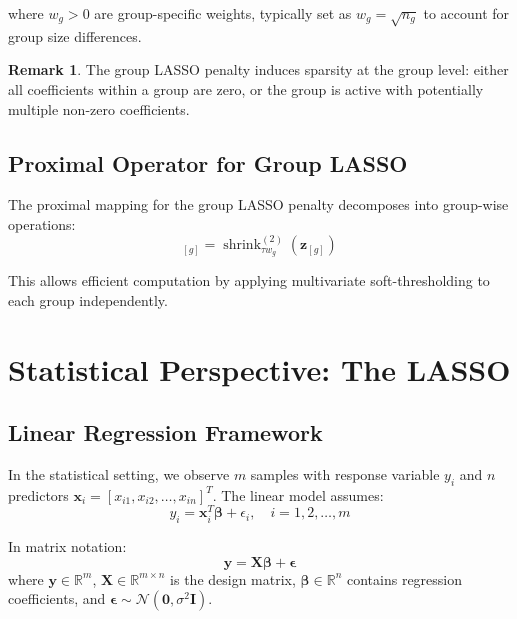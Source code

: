 \documentclass[12pt]{article}
\renewcommand{\vec}[1]{\mathbf{#1}}
\DeclareMathOperator{\prox}{prox}
\DeclareMathOperator{\shrink}{shrink}
\theoremstyle{definition}
\newtheorem{remark}{Remark}[section]
\begin{document}
where $w_g > 0$ are group-specific weights, typically set as $w_g = \sqrt{n_g}$ to account for group size differences.

\begin{remark}
    The group LASSO penalty induces sparsity at the group level: either all coefficients within a group are zero, or the group is active with potentially multiple non-zero coefficients.
\end{remark}

\subsection{Proximal Operator for Group LASSO}

The proximal mapping for the group LASSO penalty decomposes into group-wise operations:
\begin{equation}
    [\prox_{\tau\sum_g w_g\|\cdot\|_2}(\vec{z})]_{[g]} = \shrink_{\tau w_g}^{(2)}(\vec{z}_{[g]})
\end{equation}

This allows efficient computation by applying multivariate soft-thresholding to each group independently.

\newpage

\section{Statistical Perspective: The LASSO}

\subsection{Linear Regression Framework}

In the statistical setting, we observe $m$ samples with response variable $y_i$ and $n$ predictors $\vec{x}_i = [x_{i1}, x_{i2}, \ldots, x_{in}]^T$. The linear model assumes:
\begin{equation}
    y_i = \vec{x}_i^T\vec{\beta} + \epsilon_i, \quad i = 1, 2, \ldots, m
    \label{eq:linear_model}
\end{equation}

In matrix notation:
\begin{equation}
    \vec{y} = \vec{X}\vec{\beta} + \vec{\epsilon}
\end{equation}
where $\vec{y} \in \mathbb{R}^m$, $\vec{X} \in \mathbb{R}^{m \times n}$ is the design matrix, $\vec{\beta} \in \mathbb{R}^n$ contains regression coefficients, and $\vec{\epsilon} \sim \mathcal{N}(\vec{0}, \sigma^2\vec{I})$.
\end{document}
